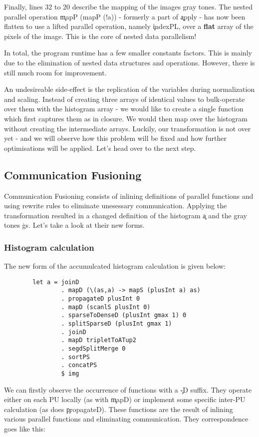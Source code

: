       
      Finally, lines 32 to 20 describe the mapping of the images gray tones.
      The nested parallel operation \c{mapP (mapP (!a))} - formerly a part of \c{apply} - 
      has now been flatten to use a lifted parallel operation, namely \c{indexPL}, over a \textbf{flat} array of
      the pixels of the image. This is the core of nested data parallelism!
      
      In total, the program runtime has a few smaller constants factors. This is mainly due to the elimination of nested data structures
      and operations. However, there is still much room for improvement.
      
      An undesireable side-effect
      is the replication of the variables during normalization and scaling. Instead of creating three arrays of identical values
      to bulk-operate over them with the histogram array - we would like to create a single function which first
      captures them as in closure. We would then map over the histogram without creating the intermediate arrays.
      Luckily, our transformation is not over yet - and we will observe how this problem will be fixed and how further optimisations will be applied.
      Let's head over to the next step.
      
    \subsection{Communication Fusioning}
      
      Communication Fusioning consists of inlining definitions of parallel functions and using rewrite rules to eliminate
      unesessary communication. Applying the transformation resulted in a changed definition of the histogram \c{a} and the
      gray tones \c{gs}. Let's take a look at their new forms.
      
      \subsubsection{Histogram calculation}
        The new form of the accumulcated histogram calculation is given below:
        \begin{lstlisting}
        let a = joinD
                . mapD (\(as,a) -> mapS (plusInt a) as)
                . propagateD plusInt 0
                . mapD (scanlS plusInt 0)
                . sparseToDenseD (plusInt gmax 1) 0
                . splitSparseD (plusInt gmax 1)
                . joinD
                . mapD tripletToATup2
                . segdSplitMerge 0
                . sortPS
                . concatPS
                $ img
        \end{lstlisting}
        We can firstly observe the occurrence of functions with a \c{-D} suffix. They operate either
        on each PU locally (as with \c{mapD}) or implement some specific inter-PU calculation (as does \c{propagateD}).
        These functions are the result of inlining various parallel functions and eliminating communication. They correspondence
        goes like this:
        
